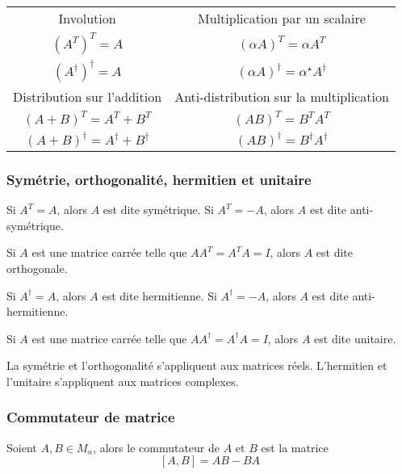 \begingroup
\renewcommand{\arraystretch}{1.5}

\begin{center}
    
    \begin{tabular}{c@{\hskip 1in} c}
        Involution & Multiplication par un scalaire \\
        $ \left( A^T \right)^T = A$ & $\left( \alpha A \right)^T = \alpha A^T$ \\ 
        $\left( A^\dagger \right)^\dagger = A $ & $\left( \alpha A \right)^\dagger = \alpha^\star A^\dagger$  \\[0.5em]
        Distribution sur l'addition   & Anti-distribution sur la multiplication \\ 
        $\left( A + B \right)^T = A^T + B^T$  & $\left( AB \right)^T = B^TA^T$ \\  
        $\left( A + B \right)^\dagger = A^\dagger + B^\dagger$ & $\left( AB \right)^\dagger = B^\dagger A^\dagger$
    \end{tabular}
\end{center}
\endgroup

\subsubsection{Symétrie, orthogonalité, hermitien et unitaire}
\begin{definition}
    Si $A^T = A$, alors $A$ est dite symétrique. Si $A^T = -A$, alors $A$ est dite anti-symétrique.
\end{definition}
\begin{definition}
    Si $A$ est une matrice carrée telle que $AA^T = A^TA = I$, alors $A$ est dite orthogonale.
\end{definition}
\begin{definition}
    Si $A^\dagger = A$, alors $A$ est dite hermitienne. Si $A^\dagger = -A$, alors $A$ est dite anti-hermitienne.
\end{definition}
\begin{definition}
    Si $A$ est une matrice carrée telle que $AA^\dagger = A^\dagger A = I$, alors $A$ est dite unitaire.
\end{definition}
\begin{remark}
    La symétrie et l'orthogonalité s'appliquent aux matrices réels.
    L'hermitien et l'unitaire s'appliquent aux matrices complexes.
\end{remark}

\subsubsection{Commutateur de matrice}
Soient $A, B \in M_n$, alors le commutateur de $A$ et $B$ est la matrice
\[ \left[ A, B \right] = AB - BA \]

